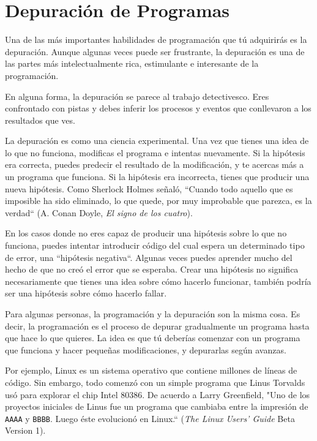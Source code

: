 \section{Depuración de Programas}

Una de las más importantes habilidades de programación 
que tú adquirirás es la depuración. Aunque algunas veces 
puede ser frustrante, la depuración es una de las partes más
intelectualmente rica, estimulante e interesante de la
programación.  

En alguna forma, la depuración se parece al trabajo detectivesco.
Eres confrontado con pistas y debes inferir los procesos y eventos
que conllevaron a los resultados que ves.

La depuración es como una ciencia experimental. Una vez que tienes
una idea de lo que no funciona, modificas el programa e intentas 
nuevamente. Si la hipótesis era correcta, puedes predecir el resultado
de la modificación, y te acercas más a un programa que funciona. Si la
hipótesis era incorrecta, tienes que producir una nueva hipótesis. 
Como Sherlock Holmes señaló, ``Cuando todo aquello que es imposible 
ha sido eliminado, lo que quede, por muy improbable que parezca, 
es la verdad`` (A. Conan Doyle, {\em El signo de los cuatro}).

En los casos donde no eres capaz de producir una hipótesis
sobre lo que no funciona, puedes intentar introducir
código del cual espera un determinado tipo de error, 
una ``hipótesis negativa``. Algunas veces puedes aprender 
mucho del hecho de que no creó el error que se esperaba. 
Crear una hipótesis no significa necesariamente que tienes 
una idea sobre cómo hacerlo funcionar, también podría ser
una hipótesis sobre cómo hacerlo fallar.

Para algunas personas, la programación y la depuración son
la misma cosa. Es decir, la programación es el proceso de 
depurar gradualmente un programa hasta que hace lo que quieres.
La idea es que tú deberías comenzar con un programa que funciona y 
hacer pequeñas modificaciones, y depurarlas según avanzas.

Por ejemplo, Linux es un sistema operativo que contiene millones 
de líneas de código. Sin embargo, todo comenzó con un simple programa
que Linus Torvalds usó para explorar el chip Intel 80386. De acuerdo
a Larry Greenfield, "Uno de los proyectos iniciales de Linus fue un 
programa que cambiaba entre la impresión de \verb|AAAA| y \verb|BBBB|.
Luego éste evolucionó en Linux.``
({\em The Linux Users' Guide} Beta Version 1).


